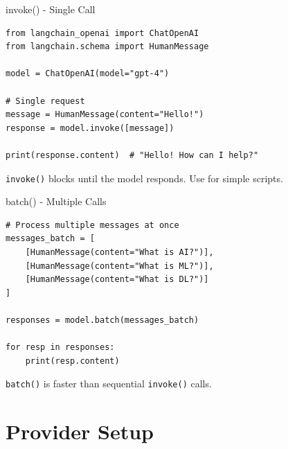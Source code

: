 \documentclass[aspectratio=169,11pt]{beamer}
\begin{document}
\begin{frame}[fragile]{invoke() - Single Call}
  \begin{codebox}
    \begin{lstlisting}
from langchain_openai import ChatOpenAI
from langchain.schema import HumanMessage

model = ChatOpenAI(model="gpt-4")

# Single request
message = HumanMessage(content="Hello!")
response = model.invoke([message])

print(response.content)  # "Hello! How can I help?"
    \end{lstlisting}
  \end{codebox}

  \vspace{0.08cm}
  \begin{tipbox}[Note]
    \texttt{invoke()} blocks until the model responds. Use for simple scripts.
  \end{tipbox}
\end{frame}

\begin{frame}[fragile]{batch() - Multiple Calls}
  \begin{codebox}
    \begin{lstlisting}
# Process multiple messages at once
messages_batch = [
    [HumanMessage(content="What is AI?")],
    [HumanMessage(content="What is ML?")],
    [HumanMessage(content="What is DL?")]
]

responses = model.batch(messages_batch)

for resp in responses:
    print(resp.content)
    \end{lstlisting}
  \end{codebox}

  \vspace{0.08cm}
  \begin{tipbox}[Efficiency]
    \texttt{batch()} is faster than sequential \texttt{invoke()} calls.
  \end{tipbox}
\end{frame}

\section{Provider Setup}
\end{document}
